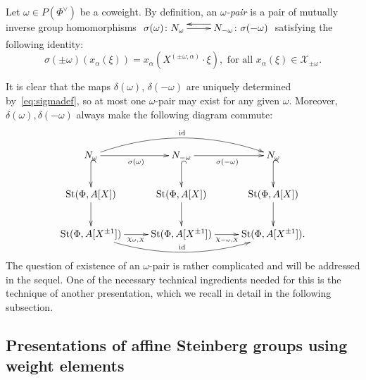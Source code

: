 \begin{dfn} \label{dfn:delta-pair}
Let $\omega \in P(\Phi^\vee)$ be a coweight.
By definition, an {\it $\omega$-pair} is a pair of mutually inverse group homomorphisms
$\xymatrix{ \sigma(\omega)\colon N_\omega \ar[r] & \ar@<-1.0ex>[l] N_{-\omega}\colon \sigma(-\omega) }$ satisfying the following identity:
\begin{equation} \label{eq:sigmadef}
\sigma(\pm \omega)(x_\alpha(\xi)) = x_\alpha(X^{(\pm \omega, \alpha)}\cdot \xi),
\text{ for all } x_\alpha(\xi) \in \mathcal{X}_{\pm\omega}.
\end{equation}\end{dfn}
It is clear that the maps $\delta(\omega)$, $\delta(-\omega)$ are uniquely determined by~\eqref{eq:sigmadef}, so at most one $\omega$-pair may exist for any given $\omega$.
Moreover, $\delta(\omega), \delta(-\omega)$ always make the following diagram commute:
\begin{equation} \label{eq:sigma-diagram}
\xymatrix{ N_\omega \ar[r]_{\sigma(\omega)}\ar@{^{(}->}[d] \ar@/^1.5pc/[rr]^{\mathrm{id}} & N_{-\omega} \ar@{^{(}->}[d] \ar[r]_{\sigma(-\omega)} & N_\omega \ar@{^{(}->}[d] \\
\St(\Phi, A[X]) \ar[d] & \St(\Phi, A[X]) \ar[d] & \St(\Phi, A[X]) \ar[d] \\
\St(\Phi, A[X^{\pm 1}]) \ar@<-0.0ex>[r]_{\chi_{\omega, X}} \ar@/_1.5pc/[rr]^{\mathrm{id}} & \St(\Phi, A[X^{\pm 1}]) \ar@<-0.0ex>[r]_{\chi_{-\omega, X}} & \St(\Phi, A[X^{\pm 1}]).} \end{equation}
The question of existence of an $\omega$-pair is rather complicated and will be addressed in the sequel.
One of the necessary technical ingredients needed for this is the technique of another presentation, which we recall in detail in the following subsection.

\subsection{Presentations of affine Steinberg groups using weight elements}